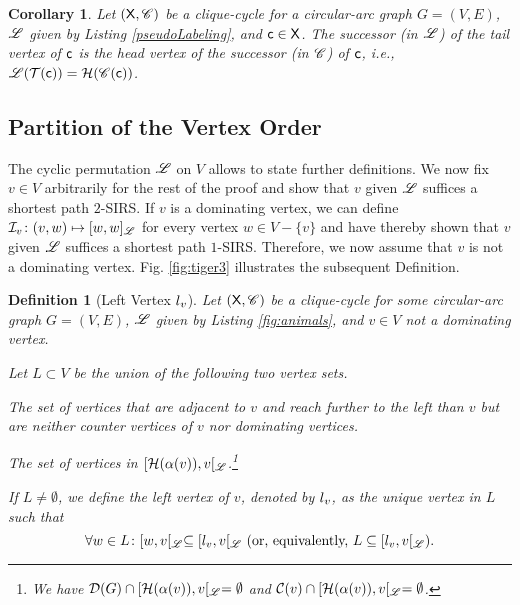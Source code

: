 \documentclass[10pt]{article}
\newtheorem{corollary}[theorem]{Corollary}
\newtheorem{definition}[theorem]{Definition}
\newcommand{\dom}{\fu{D}(G)}\newcommand{\dist}[2]{dist(#1,#2)}\newcommand{\first}[1]{\fu{H}(#1)}\newcommand{\last}[1]{\fu{T}(#1)}
\begin{document}
\begin{corollary}\label{coro:tail vertexheal}
Let $(\mathsf{X},\mathscr{C})$ be a clique-cycle for a circular-arc graph $G=(V,E)$, $\mathscr{L}$ given 
by Listing \ref{pseudoLabeling}, and $\mathsf{c}\in\mathsf{X}$.
The successor (in $\mathscr{L}$) of the tail vertex of $\mathsf{c}$ is the head vertex of the 
successor (in $\mathscr{C}$) of $\mathsf{c}$, i.e.,
$\ri{L}(\last{\mc{c}})=\first{\ri{C}(\mc{c})}$.
\end{corollary}







\subsection{Partition of the Vertex Order}\label{furtherDefs}





The cyclic permutation $\mathscr{L}$ on $V$ allows to state further definitions.
We now fix $v\in V$ arbitrarily for the rest of the proof and show that $v$ given $\mathscr{L}$ 
suffices a shortest path $2$-SIRS.
If $v$ is a dominating vertex, we can define $\mathcal{I}_v\colon(v,w)\mapsto[w,w]_{\mathscr{L}}$ 
for every vertex $w\in V-\{v\}$ and have thereby shown that $v$ given $\mathscr{L}$ suffices a shortest path $1$-SIRS.
Therefore, we now assume that $v$ is not a dominating vertex.
Fig. \ref{fig:tiger3} illustrates the subsequent Definition.

\begin{definition}[Left Vertex $l_{v}$]\label{de_l_v}
Let $(\mathsf{X},\mathscr{C})$ be a clique-cycle for some circular-arc graph $G=(V,E)$, $\mathscr{L}$ 
given by Listing \ref{fig:animals}, and $v\in V$ not a dominating vertex.
\begin{inparaenum}[(i)]
Let $L\subset V$ be the union of the following two vertex sets.
\item The set of
vertices that are adjacent to $v$ and reach further to the left than $v$ 
but are neither counter vertices of $v$ nor dominating vertices.
\item
The set of vertices in $[\first{\lc{v}},v[_\ri{L}$.\footnote{We have $\dom\cap[\first{\lc{v}},v[_\ri{L} = \emptyset$ and $\co{v} \cap [\first{\lc{v}},v[_\ri{L} = \emptyset$.}
\end{inparaenum}
If $L\neq\emptyset$, we define the \emph{left vertex of $v$}, denoted by $l_{v}$,  
as the unique vertex in $L$ such that
\begin{equation}\label{eq_l_v}
\forall w \in L\colon [w,v[_{\mathscr{L}}\subseteq[l_{v},v[_{\mathscr{L}} \text{ (or, equivalently, } L\subseteq[l_{v},v[_{\mathscr{L}}\text{)}.
\end{equation}
\end{definition}
\end{document}
